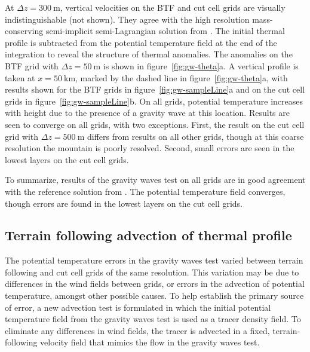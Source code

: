\documentclass{ametsoc}
\begin{document}
At $\Delta z = \SI{300}{\meter}$, vertical velocities on the BTF and cut cell grids are visually indistinguishable (not shown).  They agree with the high resolution mass-conserving semi-implicit semi-Lagrangian solution from \citet{melvin2010}.
The initial thermal profile is subtracted from the potential temperature field at the end of the integration to reveal the structure of thermal anomalies.  The anomalies on the BTF grid with $\Delta z = \SI{50}{\meter}$ is shown in figure~\ref{fig:gw-theta}a.  A vertical profile is taken at $x = \SI{50}{\kilo\meter}$, marked by the dashed line in figure~\ref{fig:gw-theta}a, with results shown for the BTF grids in figure~\ref{fig:gw-sampleLine}a and on the cut cell grids in figure~\ref{fig:gw-sampleLine}b.  On all grids, potential temperature increases with height due to the presence of a gravity wave at this location.  Results are seen to converge on all grids, with two exceptions.  First, the result on the cut cell grid with $\Delta z = \SI{500}{\meter}$ differs from results on all other grids, though at this coarse resolution the mountain is poorly resolved.  Second, small errors are seen in the lowest layers on the cut cell grids.

To summarize, results of the gravity waves test on all grids are in good agreement with the reference solution from \citet{melvin2010}.  The potential temperature field converges, though errors are found in the lowest layers on the cut cell grids.

\subsection{Terrain following advection of thermal profile}
The potential temperature errors in the gravity waves test varied between terrain following and cut cell grids of the same resolution.  This variation may be due to differences in the wind fields between grids, or errors in the advection of potential temperature, amongst other possible causes.  To help establish the primary source of error, a new advection test is formulated in which the initial potential temperature field from the gravity waves test is used as a tracer density field.  To eliminate any differences in wind fields, the tracer is advected in a fixed, terrain-following velocity field that mimics the flow in the gravity waves test.
\end{document}
